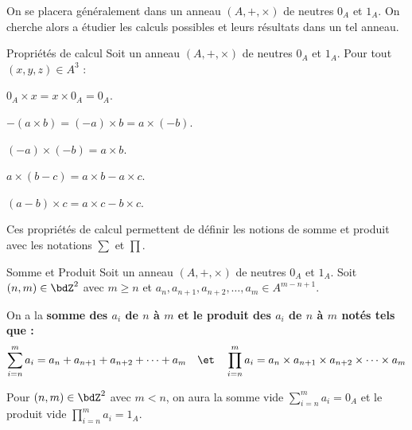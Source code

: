 \documentclass[a4paper,french,bookmarks]{article}
\begin{document}
On se placera généralement dans un anneau $(A, +, \times)$ de neutres $0_A$ et $1_A$. On cherche alors a étudier les calculs possibles et leurs résultats dans un tel anneau.


\begin{property}{Propriétés de calcul}{}
    Soit un anneau $(A, +, \times)$ de neutres $0_A$ et $1_A$. Pour tout $(x, y, z) \in A^3$ :
    \begin{enumerate}
        \ithand $0_A \times x = x \times 0_A = 0_A$.
        
        \ithand $-(a \times b) = (-a)\times b = a \times (-b)$.
        
        \ithand $(-a) \times (-b) = a\times b$.
        
        \ithand $a \times (b - c) = a \times b - a \times c$.
        
        \ithand $(a-b) \times c = a \times c - b \times c$.
    \end{enumerate}
\end{property}


Ces propriétés de calcul permettent de définir les notions de somme et produit avec les notations $\sum$ et $\prod$.

\begin{definition}{Somme et Produit}{}
    Soit un anneau $(A, +, \times)$ de neutres $0_A$ et $1_A$.  Soit $(n,m) \in \bdZ^2$ avec $m \geq n$ et $a_n, a_{n+1}, a_{n+2}, \dots, a_{m} \in A^{m-n+1}$.
    
    On a la \bf{somme des $a_i$ de $n$ à $m$} et le \bf{produit des $a_i$ de $n$ à $m$} notés tels que :
    \[ \sum_{i=n}^m a_i = a_n + a_{n+1} + a_{n+2} + \dots + a_{m} \quad\et\quad \prod_{i=n}^m a_i = a_n \times a_{n+1} \times a_{n+2} \times \dots \times a_{m}\]
    
    Pour $(n, m) \in \bdZ^2$ avec $m < n$, on aura la somme vide $\displaystyle \sum_{i=n}^{m} a_i = 0_A$ et le produit vide $\displaystyle \prod_{i=n}^{m} a_i = 1_A$.
\end{definition}
\end{document}
